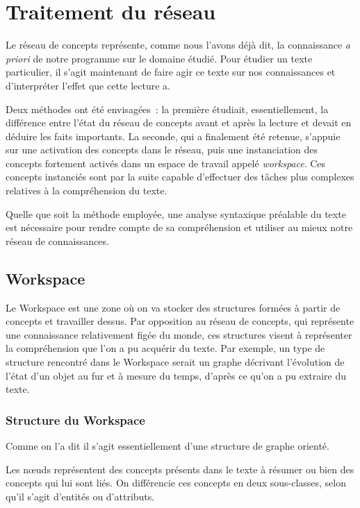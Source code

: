 \documentclass[a4paper, 12pt]{article}
\begin{document}

\section{Traitement du réseau}

Le réseau de concepts représente, comme nous l'avons déjà dit, la connaissance \textit{a priori} de notre programme sur le domaine étudié. Pour étudier un texte particulier, il s'agit maintenant de faire agir ce texte sur nos connaissances et d'interpréter l'effet que cette lecture a.

Deux méthodes ont été envisagées~: la première étudiait, essentiellement, la différence entre l'état du réseau de concepts avant et après la lecture et devait en déduire les faits importants. La seconde, qui a finalement été retenue, s'appuie sur une activation des concepts dans le réseau, puis une instanciation des concepts fortement activés dans un espace de travail appelé \textit{workspace}. Ces concepts instanciés sont par la suite capable d'effectuer des tâches plus complexes relatives à la compréhension du texte.

Quelle que soit la méthode employée, une analyse syntaxique préalable du texte est nécessaire pour rendre compte de sa compréhension et utiliser au mieux notre réseau de connaissances.

\subsection{Workspace}
Le Workspace est une zone où on va stocker des structures formées à partir de concepts et travailler dessus. Par opposition au réseau de concepts, qui représente une connaissance relativement figée du monde, ces structures visent à représenter la compréhension que l'on a pu acquérir du texte.
Par exemple, un type de structure rencontré dans le Workspace serait un graphe décrivant l'évolution de l'état d'un objet au fur et à mesure du temps, d'après ce qu'on a pu extraire du texte.

\subsubsection{Structure du Workspace}
Comme on l'a dit il s'agit essentiellement d'une structure de graphe orienté.

Les nœuds représentent des concepts présents dans le texte à résumer ou bien des concepts qui lui sont liés. On différencie ces concepts en deux sous-classes, selon qu'il s'agit d'entités ou d'attributs.
\end{document}
